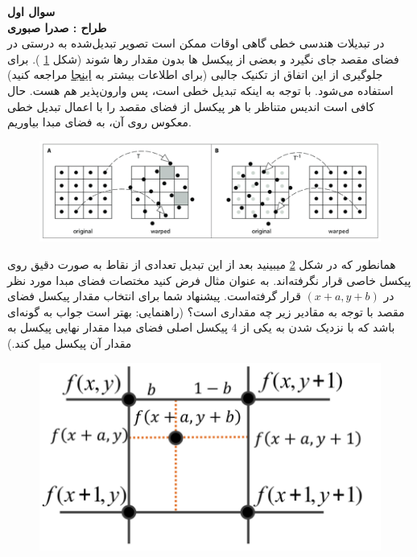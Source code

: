 \documentclass[a4paper]{article}
\begin{document}
\vspace{0.5cm}
\textbf{\LARGE
	سوال اول
}
\\
\textbf{طراح :‌ صدرا صبوری}
\\
در تبدیلات هندسی خطی گاهی اوقات ممکن است تصویر تبدیل‌شده به درستی در فضای مقصد جای نگیرد و بعضی از پیکسل ها بدون مقدار رها شوند 
(شکل 
\ref{Inverse Warping}
).
برای جلوگیری از این اتفاق از تکنیک جالبی (برای اطلاعات بیشتر به  
\href{https://www.researchgate.net/publication/267946997_Non-rigid_Registration_Using_Free-form_Deformations}{اینجا}
مراجعه کنید) استفاده می‌شود. با توجه به اینکه تبدیل خطی است، پس وارون‌پذیر هم هست. حال کافی است اندیس متناظر با هر پیکسل از فضای مقصد را با اعمال تبدیل خطی معکوس روی آن، به فضای مبدا بیاوریم.
\begin{figure}[H]
	\centering
	\includegraphics[width=0.8 \linewidth]{images/Q5_1.png}
	\caption{}
	\label{Inverse Warping}
\end{figure}

همانطور که در شکل
\ref{Interpolation} 
میبینید بعد از این تبدیل تعدادی از نقاط به صورت دقیق روی پیکسل خاصی قرار نگرفته‌اند. به عنوان مثال فرض کنید مختصات فضای مبدا مورد نظر در $ (x+a, y+b)  $ قرار گرفته‌است. پیشنهاد شما برای انتخاب مقدار پیکسل فضای مقصد با توجه به مقادیر زیر چه مقداری است؟ (راهنمایی: بهتر است جواب به گونه‌ای باشد که با نزدیک شدن به یکی از $ 4 $ پیکسل اصلی فضای مبدا مقدار نهایی پیکسل به مقدار آن پیکسل میل کند.)

\begin{figure}[h]
	\centering
	\includegraphics[width=0.45 \linewidth]{images/Q5_2.png}
	\caption{}
	\label{Interpolation}
\end{figure}
\end{document}
